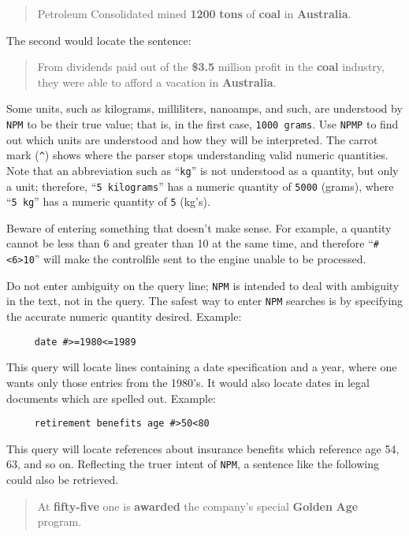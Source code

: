 \begin{quote}
     Petroleum Consolidated mined {\bf 1200} {\bf tons} of {\bf coal}
     in {\bf Australia}.
\end{quote}

The second would locate the sentence:

\begin{quote}

     From dividends paid out of the {\bf \$}{\bf 3.5} million profit in the
     {\bf coal} industry, they were able to afford a vacation in {\bf Australia}.

\end{quote}

     Some units, such as kilograms, milliliters, nanoamps, and such, are
understood by \verb`NPM` to be their true value; that is, in the first case,
\verb`1000 grams`.  Use \verb`NPMP` to find out which units are understood and
how they will be interpreted.  The carrot mark (\verb`^`) shows where the parser
stops understanding valid numeric quantities.  Note that an abbreviation such
as ``\verb`kg`'' is not understood as a quantity, but only a unit; therefore,
``\verb`5 kilograms`'' has a numeric quantity of \verb`5000` (grams), where
``\verb`5 kg`'' has a numeric quantity of \verb`5` (kg's).

     Beware of entering something that doesn't make sense.  For example, a
quantity cannot be less than 6 and greater than 10 at the same time, and
therefore ``\verb`#<6>10`'' will make the controlfile sent to the engine unable to be
processed.

     Do not enter ambiguity on the query line; \verb`NPM` is intended to deal with
ambiguity in the text, not in the query.  The safest way to enter \verb`NPM` searches
is by specifying the accurate numeric quantity desired.  Example:
\begin{verbatim}
     date #>=1980<=1989
\end{verbatim}
This query will locate lines containing a date specification and a year, where
one wants only those entries from the 1980's.  It would also locate dates in legal
documents which are spelled out.  Example:
\begin{verbatim}
     retirement benefits age #>50<80
\end{verbatim}
This query will locate references about insurance benefits which reference
age 54, 63, and so on.  Reflecting the truer intent of \verb`NPM`, a sentence like
the following could also be retrieved.

\begin{quote}
     At {\bf fifty-five} one is {\bf awarded} the company's special
     {\bf Golden} {\bf Age} program.
\end{quote}


